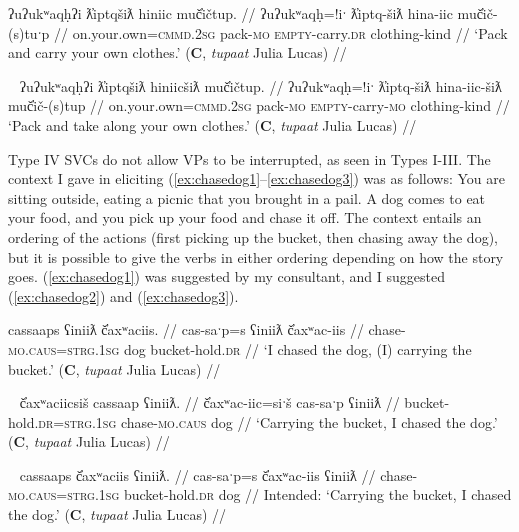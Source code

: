 \ex \label{ex:packandcarry}
\begingl
\glpreamble ʔuʔukʷaqḥʔi ƛ̓iptqšiƛ hiniic muč̓ičtup. //
\gla ʔuʔukʷaqḥ=!iˑ ƛ̓iptq-šiƛ hina-iic muč̓ič-(s)tuˑp //
\glb on.your.own=\textsc{cmmd.2sg} pack-\textsc{mo} \textsc{empty}-carry.\textsc{dr} clothing-kind //
\glft `Pack and carry your own clothes.' (\textbf{C}, \textit{tupaat} Julia Lucas) //
\endgl
\xe

\ex~ \label{ex:packandtake}
\begingl
\glpreamble ʔuʔukʷaqḥʔi ƛ̓iptqšiƛ hiniicšiƛ muč̓ičtup. //
\gla ʔuʔukʷaqḥ=!iˑ ƛ̓iptq-šiƛ hina-iic-šiƛ muč̓ič-(s)tup //
\glb on.your.own=\textsc{cmmd.2sg} pack-\textsc{mo} \textsc{empty}-carry-\textsc{mo} clothing-kind //
\glft `Pack and take along your own clothes.' (\textbf{C}, \textit{tupaat} Julia Lucas) //
\endgl
\xe

Type IV SVCs do not allow VPs to be interrupted, as seen in Types I-III. The context I gave in eliciting (\ref{ex:chasedog1}--\ref{ex:chasedog3}) was as follows: You are sitting outside, eating a picnic that you brought in a pail. A dog comes to eat your food, and you pick up your food and chase it off. The context entails an ordering of the actions (first picking up the bucket, then chasing away the dog), but it is possible to give the verbs in either ordering depending on how the story goes. (\ref{ex:chasedog1}) was suggested by my consultant, and I suggested (\ref{ex:chasedog2}) and (\ref{ex:chasedog3}). 

\ex \label{ex:chasedog1}
\begingl
\glpreamble cassaaps ʕiniiƛ č̓axʷaciis. //
\gla cas-saˑp=s ʕiniiƛ č̓axʷac-iis //
\glb chase-\textsc{mo.caus}=\textsc{strg.1sg} dog bucket-hold.\textsc{dr} //
\glft `I chased the dog, (I) carrying the bucket.' (\textbf{C}, \textit{tupaat} Julia Lucas) //
\endgl
\xe

\ex~ \label{ex:chasedog2}
\begingl
\glpreamble č̓axʷaciicsiš cassaap ʕiniiƛ. //
\gla č̓axʷac-iic=siˑš cas-saˑp ʕiniiƛ //
\glb bucket-hold.\textsc{dr}=\textsc{strg.1sg} chase-\textsc{mo.caus} dog //
\glft `Carrying the bucket, I chased the dog.' (\textbf{C}, \textit{tupaat} Julia Lucas) //
\endgl
\xe

\ex~ \label{ex:chasedog3}
\begingl
\glpreamble *cassaaps č̓axʷaciis ʕiniiƛ. //
\gla cas-saˑp=s č̓axʷac-iis ʕiniiƛ //
\glb chase-\textsc{mo.caus}=\textsc{strg.1sg} bucket-hold.\textsc{dr} dog //
\glft Intended: `Carrying the bucket, I chased the dog.' (\textbf{C}, \textit{tupaat} Julia Lucas) //
\endgl
\xe


